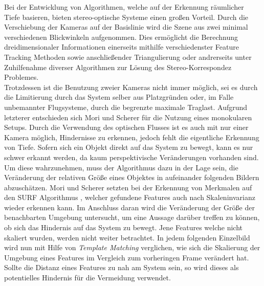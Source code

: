 \noindent
Bei der Entwicklung von Algorithmen, welche auf der Erkennung räumlicher Tiefe basieren, bieten stereo-optische Systeme einen großen Vorteil. Durch die Verschiebung der Kameras auf der Basislinie wird die Szene aus zwei minimal verschiedenen Blickwinkeln aufgenommen. Dies ermöglicht die Berechnung dreidimensionaler Informationen einerseits mithilfe verschiedenster Feature Tracking Methoden sowie anschließender Triangulierung oder andrerseits unter Zuhilfenahme diverser Algorithmen zur Lösung des Stereo-Korrespondez Problemes.\\
\noindent
Trotzdessen ist die Benutzung zweier Kameras nicht immer möglich, sei es durch die Limitierung durch das System selber aus Platzgründen oder, im Falle unbemannter Flugsysteme, durch die begrenzte maximale Traglast. Aufgrund letzterer entschieden sich Mori und Scherer \cite{mori2013first} für die Nutzung eines monokularen Setups. Durch die Verwendung des optischen Flusses ist es auch mit nur einer Kamera möglich, Hindernisse zu erkennen, jedoch fehlt die eigentliche Erkennung von Tiefe. Sofern sich ein Objekt direkt auf das System zu bewegt, kann es nur schwer erkannt werden, da kaum perspektivische Veränderungen vorhanden sind. Um diese wahrzunehmen, muss der Algorithmus dazu in der Lage sein, die Veränderung der relativen Größe eines Objektes in aufeinander folgenden Bildern abzuschätzen. Mori und Scherer setzten bei der Erkennung von Merkmalen auf den SURF Algorithmus \cite{bay2006surf}, welcher gefundene Features auch nach Skaleninvarianz wieder erkennen kann. Im Anschluss daran wird die Veränderung der Größe der benachbarten Umgebung untersucht, um eine Aussage darüber treffen zu können, ob sich das Hindernis auf das System zu bewegt. Jene Features welche nicht skaliert wurden, werden nicht weiter betrachtet. In jedem folgenden Einzelbild wird nun mit Hilfe von \emph{Template Matching} verglichen, wie sich die Skalierung der Umgebung eines Features im Vergleich zum vorheringen Frame verändert hat. Sollte die Distanz eines Features zu nah am System sein, so wird dieses als potentielles Hindernis für die Vermeidung verwendet.
